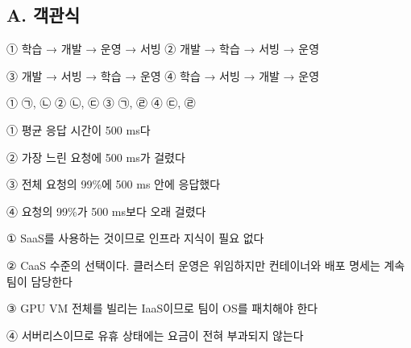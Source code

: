 \subsection*{A. 객관식}


\begin{tbboptions}
  \item ① 학습 → 개발 → 운영 → 서빙        ② 개발 → 학습 → 서빙 → 운영
  \item ③ 개발 → 서빙 → 학습 → 운영        ④ 학습 → 서빙 → 개발 → 운영
\end{tbboptions}


\begin{tbboptions}
  \item ① ㉠, ㉡        ② ㉡, ㉢        ③ ㉠, ㉣        ④ ㉢, ㉣
\end{tbboptions}


\begin{tbboptions}
  \item ① 평균 응답 시간이 500 ms다
  \item ② 가장 느린 요청에 500 ms가 걸렸다
  \item ③ 전체 요청의 99\%에 500 ms 안에 응답했다
  \item ④ 요청의 99\%가 500 ms보다 오래 걸렸다
\end{tbboptions}


\begin{tbboptions}
  \item ① SaaS를 사용하는 것이므로 인프라 지식이 필요 없다
  \item ② CaaS 수준의 선택이다. 클러스터 운영은 위임하지만 컨테이너와 배포 명세는 계속 팀이 담당한다
  \item ③ GPU VM 전체를 빌리는 IaaS이므로 팀이 OS를 패치해야 한다
  \item ④ 서버리스이므로 유휴 상태에는 요금이 전혀 부과되지 않는다
\end{tbboptions}


